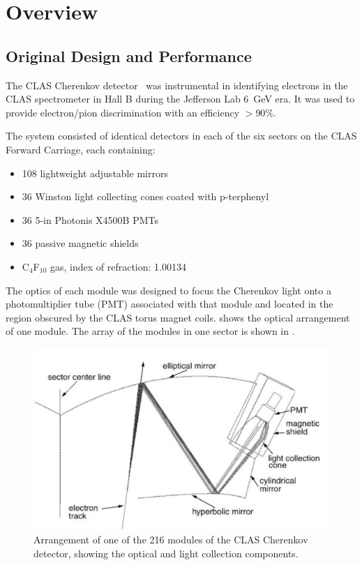 \section{Overview}

\subsection{Original Design and Performance}

The CLAS Cherenkov detector~\cite{Adams:2001kk} was instrumental in identifying electrons in the CLAS
spectrometer in Hall B during the Jefferson Lab 6~GeV era. It was used to provide electron/pion discrimination
with an efficiency $> 90\%$.

The system consisted of identical detectors in each of the six sectors on the CLAS Forward Carriage, each
containing:

\begin{itemize}
	\item 108 lightweight adjustable mirrors
	\item 36 Winston light collecting cones coated with p-terphenyl
	\item 36 5-in Photonis X4500B PMTs
	\item 36 passive magnetic shields
	\item C$_4$F$_{10}$ gas, index of refraction: 1.00134
\end{itemize}

The optics of each module was designed to focus the Cherenkov light onto a photomultiplier tube (PMT) associated
with that module and located in the region obscured by the CLAS torus magnet coils.  shows
the optical arrangement of one module. The array of the modules in one sector is shown in .

\begin{figure}[ht]
	\centering
	\includegraphics[width=1.0\columnwidth,keepaspectratio]{img/optics.png}
	\caption{Arrangement of one of the 216 modules of the CLAS Cherenkov detector, showing the optical and
          light collection components.}
	\label{fig:optics}
\end{figure}

